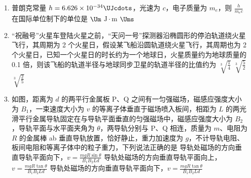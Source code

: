 \documentclass[\gkver]{gaokaozhenti}
\begin{document}
\begin{enumerate}
\item
普朗克常量 $h=6.626\times10^{-34}\UJcdots$，光速为 $c$，电子质量为 $m_{e}$，则 $\frac{h}{m_{e}c}$ 在国际单位制下的单位是
\fourchoices[answer=B]
{$\UJs$}
{$\Um$}
{$\mathrm{J}\cdot\mathrm{m}$}
{$\Ums$}


\item
“祝融号”火星车登陆火星之前，“天问一号”探测器沿椭圆形的停泊轨道绕火星飞行，其周期为 2 个火星日，假设某飞船沿圆轨道绕火星飞行，其周期也为 2 个火星日，已知一个火星日的时长约为一个地球日，火星质量约为地球质量的 0.1 倍，则该飞船的轨道半径与地球同步卫星的轨道半径的比值约为
{$\sqrt[3]{\frac{1}{4}}$}
{$\sqrt[3]{\frac{5}{2}}$}
{$\sqrt[3]{\frac{2}{5}}$}


\item
如图，距离为 $d$ 的两平行金属板 P、Q 之间有一匀强磁场，磁感应强度大小为 $B_{1}$，一束速度大小为 $v$ 的等离子体垂直于磁场喷入板间，相距为 $L$ 的两光滑平行金属导轨固定在与导轨平面垂直的匀强磁场中，磁感应强度大小为 $B_{2}$，导轨平面与水平面夹角为 $\theta$，两导轨分别与 P、Q 相连，质量为 $m$、电阻为 $R$ 的金属棒 ab 垂直导轨放置，恰好静止，重力加速度为 $g$，不计导轨电阻、板间电阻和等离子体中的粒子重力，下列说法正确的是
{导轨处磁场的方向垂直导轨平面向下，$v=\frac{mgR\sin\theta}{B_{1}B_{2}Ld}$}
{导轨处磁场的方向垂直导轨平面向上，$v=\frac{mgR\tan\theta}{B_{1}B_{2}Ld}$}
{导轨处磁场的方向垂直导轨平面向下，$v=\frac{mgR\tan\theta}{B_{1}B_{2}Ld}$}


\end{enumerate}
\end{document}
